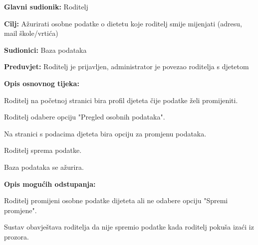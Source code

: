 					\noindent {}
					\begin{packed_item}
						
						\item \textbf{Glavni sudionik: }Roditelj
						\item  \textbf{Cilj:} Ažurirati osobne podatke o dietetu koje roditelj smije mijenjati (adresu, mail škole/vrtića)
						\item  \textbf{Sudionici:} Baza podataka
						\item  \textbf{Preduvjet:} Roditelj je prijavljen, administrator je povezao roditelja s djetetom
						\item  \textbf{Opis osnovnog tijeka:}
						
						\item[] \begin{packed_enum}
							
							\item Roditelj na početnoj stranici bira profil djeteta čije podatke želi promijeniti. 
							\item Roditelj odabere opciju "Pregled osobnih podataka".
							\item Na stranici s podacima djeteta bira opciju za promjenu podataka.
							\item Roditelj sprema podatke.
							\item Baza podataka se ažurira.
						\end{packed_enum}
						
						\item  \textbf{Opis mogućih odstupanja:}
						
						\item[] \begin{packed_item}
							
							\item[4.a] Roditelj promijeni osobne podatke dijeteta ali ne odabere opciju "Spremi promjene".
							\item[] \begin{packed_enum}
								
								\item Sustav obavještava roditelja da nije spremio podatke kada roditelj pokuša izaći iz prozora.
							\end{packed_enum}
							
						\end{packed_item}
					\end{packed_item}
					
